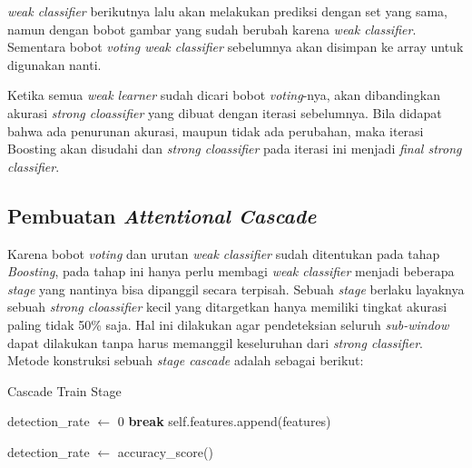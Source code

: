 \textit{weak classifier} berikutnya lalu akan melakukan prediksi dengan set yang sama, 
namun dengan bobot gambar yang sudah berubah karena \textit{weak classifier}. Sementara 
bobot \textit{voting weak classifier} sebelumnya akan disimpan ke array untuk digunakan nanti. 

Ketika semua \textit{weak learner} sudah dicari bobot \textit{voting}-nya, akan dibandingkan 
akurasi \textit{strong cloassifier} yang dibuat dengan iterasi sebelumnya. Bila didapat bahwa 
ada penurunan akurasi, maupun tidak ada perubahan, maka iterasi Boosting akan disudahi dan 
\textit{strong cloassifier} pada iterasi ini menjadi \textit{final strong classifier}.

\subsection{Pembuatan \emph{Attentional Cascade}}

Karena bobot \textit{voting} dan urutan \textit{weak classifier} sudah ditentukan pada 
tahap \textit{Boosting}, pada tahap ini hanya perlu membagi \textit{weak classifier} menjadi 
beberapa \textit{stage} yang nantinya bisa dipanggil secara terpisah. Sebuah \textit{stage} 
berlaku layaknya sebuah \textit{strong cloassifier} kecil yang ditargetkan hanya memiliki 
tingkat akurasi paling tidak 50\% saja. Hal ini dilakukan agar pendeteksian seluruh \textit{sub-window} 
dapat dilakukan tanpa harus memanggil keseluruhan dari \textit{strong classifier}. 
Metode konstruksi sebuah \textit{stage cascade} adalah sebagai berikut:

\begin{algorithm}
  \caption{Cascade Train Stage}
  \begin{algorithmic}[1]
      \State detection\_rate $\gets$ 0
          \State \textbf{break}
        \EndIf
        \State self.features.append(features)

        \State detection\_rate $\gets$ accuracy\_score()
      \EndWhile
    \EndFunction
  \end{algorithmic}
\end{algorithm}

